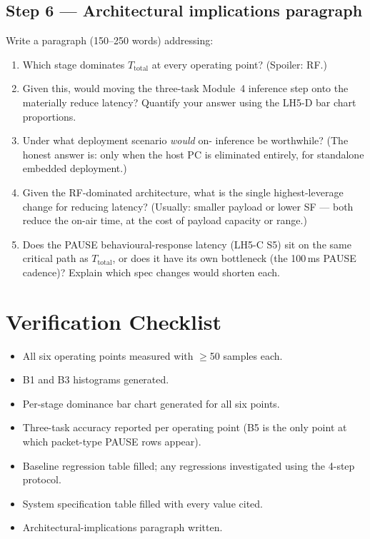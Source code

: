 \documentclass[11pt,letterpaper]{article}
\begin{document}
\subsection{Step 6 --- Architectural implications paragraph}
Write a paragraph (150--250 words) addressing:

\begin{enumerate}[leftmargin=2em]
	\item Which stage dominates $T_{\text{total}}$ at every operating point? (Spoiler: \mbox{RF}.)
	\item Given this, would moving the three-task Module~4 inference step onto the \FPGA{} materially reduce latency? Quantify your answer using the LH5-D bar chart proportions.
	\item Under what deployment scenario \emph{would} on-\FPGA{} inference be worthwhile? (The honest answer is: only when the host \mbox{PC} is eliminated entirely, for standalone embedded deployment.)
	\item Given the \mbox{RF}-dominated architecture, what is the single highest-leverage change for reducing latency? (Usually: smaller payload or lower SF --- both reduce the on-air time, at the cost of payload capacity or range.)
	\item Does the PAUSE behavioural-response latency (LH5-C S5) sit on the same critical path as $T_{\text{total}}$, or does it have its own bottleneck (the 100\,ms PAUSE cadence)? Explain which spec changes would shorten each.
\end{enumerate}

\section{Verification Checklist}
\begin{itemize}[leftmargin=2em]
	\item[$\square$] All six operating points measured with $\geq$50 samples each.
	\item[$\square$] B1 and B3 histograms generated.
	\item[$\square$] Per-stage dominance bar chart generated for all six points.
	\item[$\square$] Three-task accuracy reported per operating point (B5 is the only point at which packet-type PAUSE rows appear).
	\item[$\square$] Baseline regression table filled; any regressions investigated using the 4-step protocol.
	\item[$\square$] System specification table filled with every value cited.
	\item[$\square$] Architectural-implications paragraph written.
\end{itemize}
\end{document}
